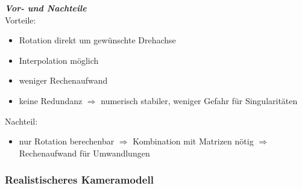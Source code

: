 \textbf{\textsl{Vor- und Nachteile}} \\
Vorteile:
\begin{itemize}
\item Rotation direkt um gewünschte Drehachse
\item Interpolation möglich
\item weniger Rechenaufwand
\item keine Redundanz $\Rightarrow$ numerisch stabiler, weniger Gefahr für Singularitäten
\end{itemize}
Nachteil:
\begin{itemize}
\item nur Rotation berechenbar $\Rightarrow$ Kombination mit Matrizen nötig $\Rightarrow$ Rechenaufwand für Umwandlungen
\end{itemize}

\subsubsection*{Realistischeres Kameramodell}

